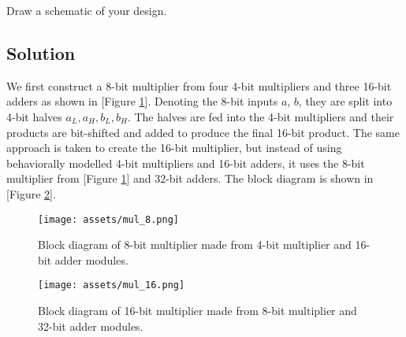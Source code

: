 \documentclass[../main.tex]{subfiles}
\begin{document}
Draw a schematic of your design.

\subsection*{Solution}

We first construct a 8-bit multiplier from four 4-bit multipliers and three 16-bit adders as shown in [Figure \ref{q9_1}]. Denoting the 8-bit inputs $a$, $b$, they are split into 4-bit halves $a_L, a_H, b_L, b_H$. The halves are fed into the 4-bit multipliers and their products are bit-shifted and added to produce the final 16-bit product. The same approach is taken to create the 16-bit multiplier, but instead of using behaviorally modelled 4-bit multipliers and 16-bit adders, it uses the 8-bit multiplier from [Figure \ref{q9_1}] and 32-bit adders. The block diagram is shown in [Figure \ref{q9_2}].

\begin{figure}[h]
    \centering
    \texttt{[image: assets/mul\_8.png]}
    \caption{Block diagram of 8-bit multiplier made from 4-bit multiplier and 16-bit adder modules.}
    \label{q9_1}
\end{figure}

\begin{figure}[h]
    \centering
    \texttt{[image: assets/mul\_16.png]}
    \caption{Block diagram of 16-bit multiplier made from 8-bit multiplier and 32-bit adder modules.}
    \label{q9_2}
\end{figure}
\end{document}
